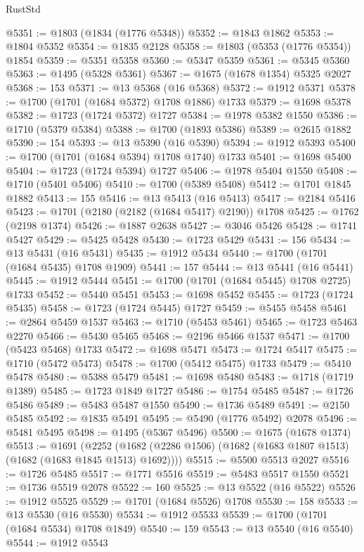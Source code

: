 \begin{lexlean}{RustStd}
\begin{coremodule}
@5351 := @1803 (@1834 (@1776 @5348))
@5352 := @1843 @1862
@5353 := @1804 @5352
@5354 := @1835 @2128
@5358 := @1803 (@5353 (@1776 @5354)) @1854
@5359 := @5351 @5358
@5360 := @5347 @5359
@5361 := @5345 @5360
@5363 := @1495 (@5328 @5361)
@5367 := @1675 (@1678 @1354) @5325 @2027
@5368 := 153
@5371 := @13 @5368 (@16 @5368)
@5372 := @1912 @5371
@5378 := @1700 (@1701 (@1684 @5372) @1708 @1886) @1733
@5379 := @1698 @5378
@5382 := @1723 (@1724 @5372) @1727
@5384 := @1978 @5382 @1550
@5386 := @1710 (@5379 @5384)
@5388 := @1700 (@1893 @5386)
@5389 := @2615 @1882
@5390 := 154
@5393 := @13 @5390 (@16 @5390)
@5394 := @1912 @5393
@5400 := @1700 (@1701 (@1684 @5394) @1708 @1740) @1733
@5401 := @1698 @5400
@5404 := @1723 (@1724 @5394) @1727
@5406 := @1978 @5404 @1550
@5408 := @1710 (@5401 @5406)
@5410 := @1700 (@5389 @5408)
@5412 := @1701 @1845 @1882
@5413 := 155
@5416 := @13 @5413 (@16 @5413)
@5417 := @2184 @5416
@5423 := @1701 (@2180 (@2182 (@1684 @5417) @2190)) @1708
@5425 := @1762 (@2198 @1374)
@5426 := @1887 @2638
@5427 := @3046 @5426
@5428 := @1741 @5427
@5429 := @5425 @5428
@5430 := @1723 @5429
@5431 := 156
@5434 := @13 @5431 (@16 @5431)
@5435 := @1912 @5434
@5440 := @1700 (@1701 (@1684 @5435) @1708 @1909)
@5441 := 157
@5444 := @13 @5441 (@16 @5441)
@5445 := @1912 @5444
@5451 := @1700 (@1701 (@1684 @5445) @1708 @2725) @1733
@5452 := @5440 @5451
@5453 := @1698 @5452
@5455 := @1723 (@1724 @5435)
@5458 := @1723 (@1724 @5445) @1727
@5459 := @5455 @5458
@5461 := @2864 @5459 @1537
@5463 := @1710 (@5453 @5461)
@5465 := @1723 @5463 @2270
@5466 := @5430 @5465
@5468 := @2196 @5466 @1537
@5471 := @1700 (@5423 @5468) @1733
@5472 := @1698 @5471
@5473 := @1724 @5417
@5475 := @1710 (@5472 @5473)
@5478 := @1700 (@5412 @5475) @1733
@5479 := @5410 @5478
@5480 := @5388 @5479
@5481 := @1698 @5480
@5483 := @1718 (@1719 @1389)
@5485 := @1723 @1849 @1727
@5486 := @1754 @5485
@5487 := @1726 @5486
@5489 := @5483 @5487 @1550
@5490 := @1736 @5489
@5491 := @2150 @5485
@5492 := @1835 @5491
@5495 := @5490 (@1776 @5492) @2078
@5496 := @5481 @5495
@5498 := @1495 (@5367 @5496)
@5500 := @1675 (@1678 @1374)
@5513 := @1691
    (@2252 (@1682 (@2286 @1506) (@1682 (@1683 @1807 @1513) (@1682 (@1683 @1845 @1513) @1692))))
@5515 := @5500 @5513 @2027
@5516 := @1726 @5485
@5517 := @1771 @5516
@5519 := @5483 @5517 @1550
@5521 := @1736 @5519 @2078
@5522 := 160
@5525 := @13 @5522 (@16 @5522)
@5526 := @1912 @5525
@5529 := @1701 (@1684 @5526) @1708
@5530 := 158
@5533 := @13 @5530 (@16 @5530)
@5534 := @1912 @5533
@5539 := @1700 (@1701 (@1684 @5534) @1708 @1849)
@5540 := 159
@5543 := @13 @5540 (@16 @5540)
@5544 := @1912 @5543

\end{coremodule}
\end{lexlean}
